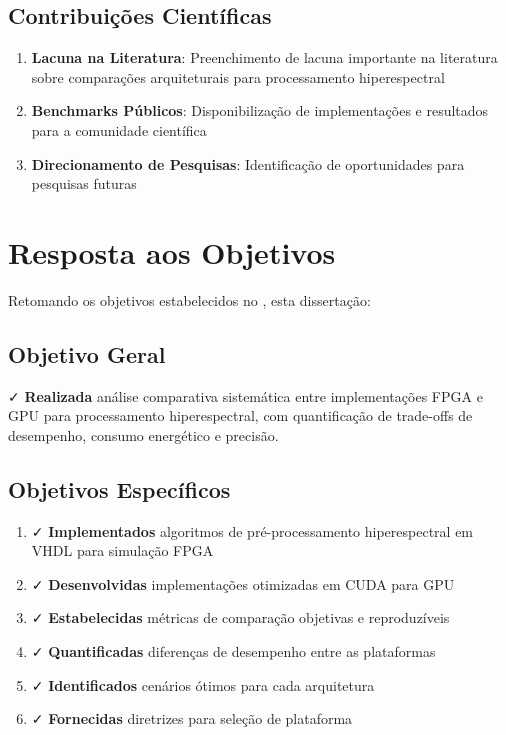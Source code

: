 \subsection{Contribuições Científicas}
\begin{enumerate}
    \item \textbf{Lacuna na Literatura}: Preenchimento de lacuna importante na literatura sobre comparações arquiteturais para processamento hiperespectral
    \item \textbf{Benchmarks Públicos}: Disponibilização de implementações e resultados para a comunidade científica
    \item \textbf{Direcionamento de Pesquisas}: Identificação de oportunidades para pesquisas futuras
\end{enumerate}

\section{Resposta aos Objetivos}\label{sec:resposta_objetivos}

Retomando os objetivos estabelecidos no , esta dissertação:

\subsection{Objetivo Geral}
✓ \textbf{Realizada} análise comparativa sistemática entre implementações FPGA e GPU para processamento hiperespectral, com quantificação de trade-offs de desempenho, consumo energético e precisão.

\subsection{Objetivos Específicos}
\begin{enumerate}
    \item ✓ \textbf{Implementados} algoritmos de pré-processamento hiperespectral em VHDL para simulação FPGA
    \item ✓ \textbf{Desenvolvidas} implementações otimizadas em CUDA para GPU
    \item ✓ \textbf{Estabelecidas} métricas de comparação objetivas e reproduzíveis
    \item ✓ \textbf{Quantificadas} diferenças de desempenho entre as plataformas
    \item ✓ \textbf{Identificados} cenários ótimos para cada arquitetura
    \item ✓ \textbf{Fornecidas} diretrizes para seleção de plataforma
\end{enumerate}

